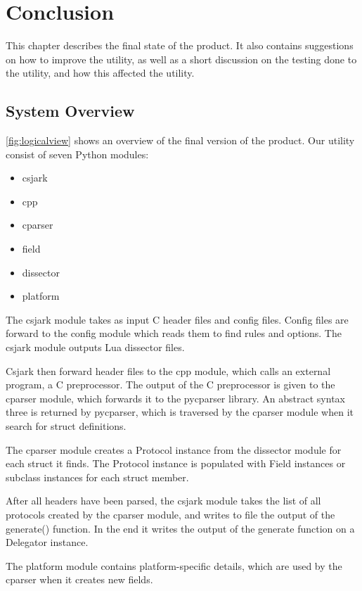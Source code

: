 \chapter{Conclusion}
\label{cha:conclusion}
This chapter describes the final state of the product.
It also contains suggestions on how to improve the utility, as well as a short discussion on the testing done to the utility, and how this affected the utility.


\section{System Overview}
\autoref{fig:logicalview} shows an overview of the final version of the
product. Our utility consist of seven Python modules:
\begin{itemize}
	\item csjark
	\item cpp
	\item cparser
	\item field
	\item dissector
	\item platform
\end{itemize}
The csjark module takes as input C header files and config files. Config
files are forward to the config module which reads them to find rules and
options. The csjark module outputs Lua dissector files.

Csjark then forward header files to the cpp module, which calls an external
program, a C preprocessor. The output of the C preprocessor is given to the
cparser module, which forwards it to the pycparser library. An abstract
syntax three is returned by pycparser, which is traversed by the cparser
module when it search for struct definitions.

The cparser module creates a Protocol instance from the dissector module for
each struct it finds. The Protocol instance is populated with Field instances
or subclass instances for each struct member.

After all headers have been parsed, the csjark module takes the list of all
protocols created by the cparser module, and writes to file the output of the
generate() function. In the end it writes the output of the generate function
on a Delegator instance.

The platform module contains platform-specific details, which are used by the
cparser when it creates new fields.

